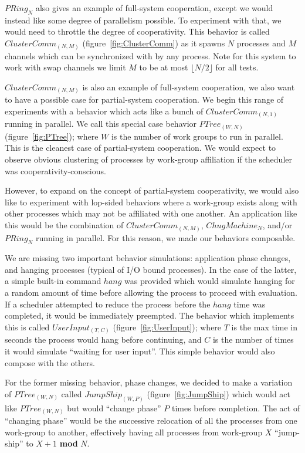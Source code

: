 $PRing_N$ also gives an example of full-system cooperation, except we would 
instead like some degree of parallelism possible. To experiment with that, we 
would need to throttle the degree of cooperativity. This behavior is called
$ClusterComm_{(N,M)}$ (figure~\ref{fig:ClusterComm}) as it spawns $N$ processes and $M$ channels which can be
synchronized with by any process. Note for this system to work with swap 
channels we limit $M$ to be at most $\lfloor N/2 \rfloor$ for all tests. 

$ClusterComm_{(N,M)}$ is also an example of full-system cooperation, we also
want to have a possible case for partial-system cooperation. We begin this range
of experiments with a behavior which acts like a bunch of $ClusterComm_{(N,1)}$
running in parallel. We call this special case behavior $PTree_{(W,N)}$ (figure~\ref{fig:PTree}); where $W$ is 
the number of work groups to run in parallel. This is the cleanest case of 
partial-system cooperation. We would expect to observe obvious clustering of 
processes by work-group affiliation if the scheduler was 
cooperativity-conscious.

However, to expand on the concept of partial-system cooperativity, we would 
also like to experiment with lop-sided behaviors where a work-group exists 
along with other processes which may not be affiliated with one another. An 
application like this would be the combination of $ClusterComm_{(N,M)}$, 
$ChugMachine_N$, and/or $PRing_N$ running in parallel. For this reason, we made
our behaviors composable.

We are missing two important behavior simulations: application phase changes,
and hanging processes (typical of I/O bound processes). In the case of the 
latter, a simple built-in command $hang$ was provided which would simulate 
hanging for a random amount of time before allowing the process to proceed with
evaluation. If a scheduler attempted to reduce the process before the $hang$ 
time was completed, it would be immediately preempted. The behavior which 
implements this is called $UserInput_{(T,C)}$ (figure~\ref{fig:UserInput}); where $T$ is the max time in seconds
the process would hang before continuing, and $C$ is the number of times it 
would simulate ``waiting for user input''. This simple behavior would also
compose with the others.

For the former missing behavior, phase changes, we decided to make a variation
of $PTree_{(W,N)}$ called $JumpShip_{(W,P)}$ (figure~\ref{fig:JumpShip}) which would act like $PTree_{(W,N)}$ but would
``change phase'' $P$ times before completion. The act of ``changing phase'' would 
be the successive relocation of all the processes from one work-group to 
another, effectively having all processes from work-group $X$ ``jump-ship'' to
$X+1$ \textbf{mod} $N$.

